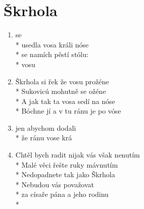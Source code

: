 \section{Škrhola}
\begin{enumerate}
\item {}   se  \\*
usedla vosa králi nóse \\*
 se namích  pěstí  stólu:  \\*
  vosu  
\item Škrhola si řek že vosu prožéne \\*
Sukovicú mohutně se ožéne \\*
A jak tak ta vosa sedí na nóse \\*
Bóchne jí a v tu ránu je po vóse 
\item {} jen abychom  dodali \\*
že  ránu  vose  krá 
\item Chtěl bych radit nijak vás však nenutím \\*
Malé věci řešte ruky mávnutím \\*
Nedopadnete tak jako Škrhola \\*
Nebudou vás považovat \\*
za císaře pána a jeho rodinu \\*
\end{enumerate}
